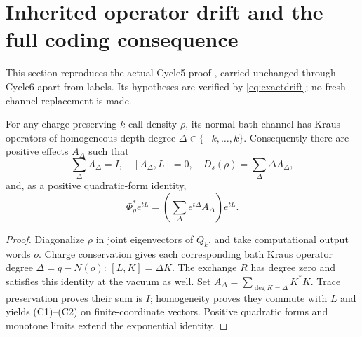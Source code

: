 \section{Inherited operator drift and the full coding consequence}\label{sec:inheritedcoding}

This section reproduces the actual Cycle5 proof \cite{Cycle5}, carried unchanged through Cycle6 apart from labels. Its hypotheses are verified by \eqref{eq:exactdrift}; no fresh-channel replacement is made.

\begin{lemma}\label{lem:grade}
For any charge-preserving $k$-call density $\rho$, its normal bath channel
has Kraus operators of homogeneous depth degree
$\Delta\in\{-k,\ldots,k\}$. Consequently there are positive effects
$A_\Delta$ such that
\[
 \sum_\Delta A_\Delta=I,\quad [A_\Delta,L]=0,\quad
 D_s(\rho)=\sum_\Delta\Delta A_\Delta,
 \tag{C1}
\]
and, as a positive quadratic-form identity,
\[
 \Phi_\rho^*e^{tL}
 =\left(\sum_\Delta e^{t\Delta}A_\Delta\right)e^{tL}.
 \tag{C2}
\]
\end{lemma}
\begin{proof}
Diagonalize $\rho$ in joint eigenvectors of $Q_k$, and take computational
output words $o$. Charge conservation gives each corresponding bath Kraus
operator degree $\Delta=q-N(o)$:
$[L,K]=\Delta K$. The exchange $R$ has degree zero and satisfies this
identity at the vacuum as well. Set $A_\Delta=\sum_{\deg K=\Delta}K^*K$.
Trace preservation proves their sum is $I$; homogeneity proves they commute
with $L$ and yields (C1)--(C2) on finite-coordinate vectors. Positive
quadratic forms and monotone limits extend the exponential identity.
\end{proof}

